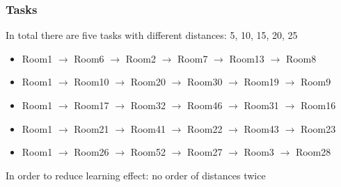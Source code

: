 \documentclass{beamer}
\begin{document}
\begin{frame}
        \frametitle{Tasks}
        
        In total there are five tasks with different distances: 5, 10, 15, 20, 25
        
        \begin{itemize}
          \item Room1 $\rightarrow$ Room6 $\rightarrow$ Room2 $\rightarrow$ Room7 $\rightarrow$ Room13 $\rightarrow$ Room8
          \item Room1 $\rightarrow$ Room10 $\rightarrow$ Room20 $\rightarrow$ Room30 $\rightarrow$ Room19 $\rightarrow$ Room9
          \item Room1 $\rightarrow$ Room17 $\rightarrow$ Room32 $\rightarrow$ Room46 $\rightarrow$ Room31 $\rightarrow$ Room16
          \item Room1 $\rightarrow$ Room21 $\rightarrow$ Room41 $\rightarrow$ Room22 $\rightarrow$ Room43 $\rightarrow$ Room23
          \item Room1 $\rightarrow$ Room26 $\rightarrow$ Room52 $\rightarrow$ Room27 $\rightarrow$ Room3 $\rightarrow$ Room28
        \end{itemize}
        
		In order to reduce learning effect: no order of distances twice
		
\end{frame}
\end{document}

